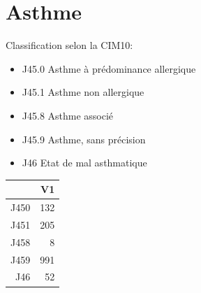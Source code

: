 \documentclass[12pt,english,french,twoside]{book}\usepackage[]{graphicx}\usepackage[]{color}
\begin{document}
\section{Asthme}

Classification selon la CIM10:
\begin{itemize}
  \item J45.0 Asthme à prédominance allergique
  \item J45.1 Asthme non allergique
  \item J45.8 Asthme associé 
  \item J45.9 Asthme, sans précision
  \item J46   Etat de mal asthmatique
\end{itemize}

\begin{table}[ht]
\centering
\begin{tabular}{rr}
  \hline
 & V1 \\ 
  \hline
J450 & 132 \\ 
  J451 & 205 \\ 
  J458 &   8 \\ 
  J459 & 991 \\ 
  J46 &  52 \\ 
   \hline
\end{tabular}
\end{table}
\end{document}
